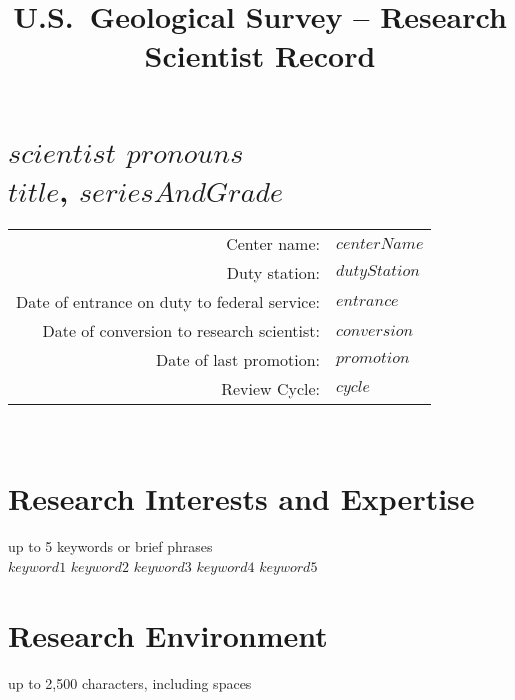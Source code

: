 \documentclass[12pt]{article}
\title{\large{U.S.~Geological Survey -- Research Scientist Record}}
\date{\vspace{-10ex}}
\begin{document}
\section*{$scientist$ $pronouns$\\ 
  $title$, $seriesAndGrade$}
\begin{center}

  \begin{tabular}{r l}
    \textrm{Center name}: & \textrm{$centerName$} \nonumber \\
    \textrm{Duty station}: & \textrm{$dutyStation$} \nonumber \\
    \textrm{Date of entrance on duty to federal service}: &
                                                            \textrm{$entrance$}
                                                            \nonumber \\
    \textrm{Date of conversion to research scientist}: &
                                                         \textrm{$conversion$}
                                                         \nonumber \\
    \textrm{Date of last promotion}: & \textrm{$promotion$} \nonumber \\
    \textrm{Review Cycle}: & \textrm{$cycle$} \nonumber
  \end{tabular} \\ \vspace{0.5cm}

\section*{Research Interests and Expertise}
\vspace{-0.2cm}
{\color{red} \footnotesize{up to 5 keywords or brief phrases}}\\
$keyword1$
$keyword2$
$keyword3$
$keyword4$
$keyword5$
\end{center}

\newpage

\section*{Research Environment}

\vspace{-0.2cm}
\begin{center}
  {\color{red} \footnotesize{up to 2,500 characters, including spaces}}\\
\end{center}
\end{document}
